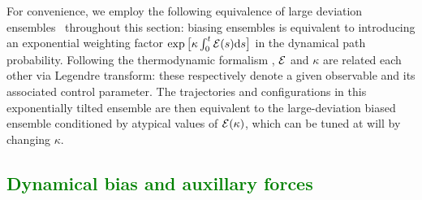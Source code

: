 \documentclass[superscriptaddress, twocolumn, prx, longbibliography, nofootinbib]{revtex4-1}
\newcommand{\tn}[1]{{\color{red}#1}}
\begin{document}
\tn{For convenience, we employ the following equivalence of large deviation ensembles~\cite{Chetrite2013} throughout this section: biasing ensembles is equivalent to } 
introducing an exponential weighting factor $\exp\big[\kappa\int_0^t{\cal E}(s){\rm d}s\big]$ in the dynamical path probability.
\tn{Following the thermodynamic formalism \cite{Touchette2009}, $\cal E$ and $\kappa$ are related each other via Legendre transform:} these respectively denote a given observable and its associated control parameter. The trajectories and configurations \tn{in this exponentially tilted ensemble} are then equivalent to the large-deviation biased ensemble conditioned by atypical values of $\cal E(\kappa)$, which can be tuned at will by changing $\kappa$.









\subsection{\textcolor{green}{Dynamical bias and auxillary forces}}\label{sec:biasexternal}
\end{document}
